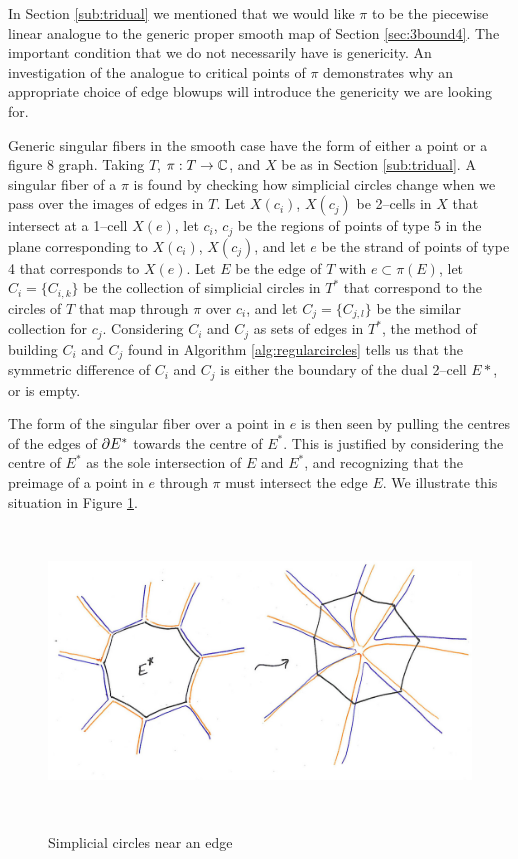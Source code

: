 In Section \ref{sub:tridual} we mentioned that we would like $\pi$ to be the piecewise linear analogue to the generic proper smooth map of Section \ref{sec:3bound4}.
The important condition that we do not necessarily have is genericity.
An investigation of the analogue to critical points of $\pi$ demonstrates why an appropriate choice of edge blowups will introduce the genericity we are looking for.

Generic singular fibers in the smooth case have the form of either a point or a figure 8 graph.
Taking $T$, $\pi:T\to\mathbb{C}$, and $X$ be as in Section \ref{sub:tridual}.
A singular fiber of a $\pi$ is found by checking how simplicial circles change when we pass over the images of edges in $T$.
Let $X(c_i)$, $X(c_j)$ be 2--cells in $X$ that intersect at a 1--cell $X(e)$, let $c_i$, $c_j$ be the regions of points of type 5 in the plane corresponding to $X(c_i)$, $X(c_j)$, and let $e$ be the strand of points of type 4 that corresponds to $X(e)$.
Let $E$ be the edge of $T$ with $e\subset\pi(E)$, let $C_i=\{C_{i,k}\}$ be the collection of simplicial circles in $T^*$ that correspond to the circles of $T$ that map through $\pi$ over $c_i$, and let $C_j=\{C_{j,l}\}$ be the similar collection for $c_j$.
Considering $C_i$ and $C_j$ as sets of edges in $T^*$, the method of building $C_i$ and $C_j$ found in Algorithm \ref{alg:regularcircles} tells us that the symmetric difference of $C_i$ and $C_j$ is either the boundary of the dual 2--cell $E*$, or is empty.

The form of the singular fiber over a point in $e$ is then seen by pulling the centres of the edges of $\partial E^*$ towards the centre of $E^*$.
This is justified by considering the centre of $E^*$ as the sole intersection of $E$ and $E^*$, and recognizing that the preimage of a point in $e$ through $\pi$ must intersect the edge $E$.
We illustrate this situation in Figure \ref{fig:plsingularities}.

\begin{figure}
	\centering
	\captionsetup{justification=centering}
	\caption{Simplicial circles near an edge}
	\includegraphics[height=3in]{figures/plsingularities.jpg}
	\label{fig:plsingularities}
\end{figure}

